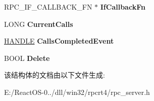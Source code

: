 \begin{DoxyCompactItemize}
R\+P\+C\+\_\+\+I\+F\+\_\+\+C\+A\+L\+L\+B\+A\+C\+K\+\_\+\+FN $\ast$ {\bfseries If\+Callback\+Fn}
\item 
\mbox{\label{struct___rpc_server_interface_a6de295ef7ebe2e46797c314c9e942b59}} 
L\+O\+NG {\bfseries Current\+Calls}
\item 
\mbox{\label{struct___rpc_server_interface_a5d53b473af82c450d8e760a58406434d}} 
\hyperlink{interfacevoid}{H\+A\+N\+D\+LE} {\bfseries Calls\+Completed\+Event}
\item 
\mbox{\label{struct___rpc_server_interface_afd45f3334e3c5e83f035421a7a5620a5}} 
B\+O\+OL {\bfseries Delete}
\end{DoxyCompactItemize}


该结构体的文档由以下文件生成\+:\begin{DoxyCompactItemize}
\item 
E\+:/\+React\+O\+S-\/0../dll/win32/rpcrt4/rpc\+\_\+server.\+h\end{DoxyCompactItemize}
